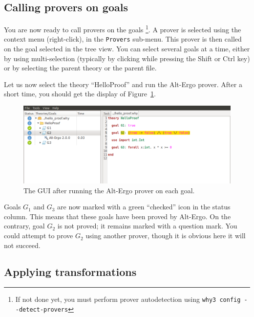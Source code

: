 \subsection{Calling provers on goals}

You are now ready to call provers on the goals
\footnote{If not done yet, you
  must perform prover autodetection using \texttt{why3 config
    -{}-detect-provers}}.
A prover is selected using the context menu (right-click), in the
\texttt{Provers} sub-menu.
This prover is then called on the goal selected
in the tree view. You can select several goals at a time, either
by using multi-selection (typically by clicking while pressing the
\textsf{Shift} or \textsf{Ctrl} key) or by selecting the parent theory
or the parent file.

Let us now select the theory ``HelloProof'' and
run the Alt-Ergo prover. After a short time, you should
get the display of Figure~\ref{fig:gui3}.
\begin{figure}[tbp]
\includegraphics[width=\textwidth]{gui-3.png}
  \caption{The GUI after running the Alt-Ergo prover on each goal.}
  \label{fig:gui3}
\end{figure}
Goals $G_1$ and $G_3$ are now marked with a green ``checked'' icon in the
status column. This means that these goals have been proved by Alt-Ergo.
On the contrary, goal $G_2$ is not proved; it remains
marked with a question mark.
You could attempt to prove $G_2$ using another prover, though it is
obvious here it will not succeed.

\subsection{Applying transformations}

